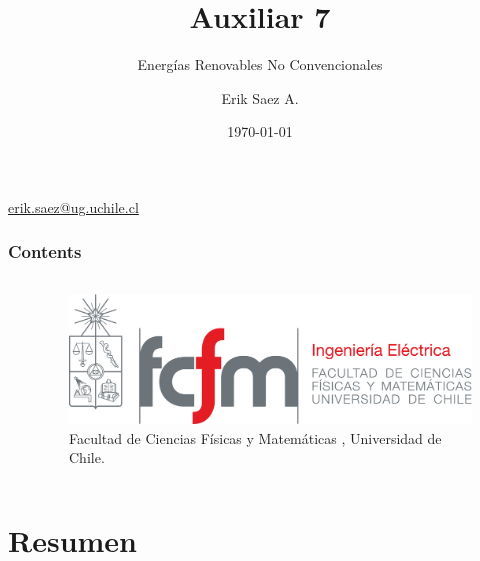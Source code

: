 \documentclass[
    10pt,
    aspectratio=169,
    xcolor={dvipsnames},
    spanish,
    ]{beamer}
\title[Presentation practice II]{\bfseries Auxiliar 7}
\subtitle{Energías Renovables No Convencionales}
\author[Erik Saez A.]{Erik Saez A.}
\institute[UChile]{Department of Electrical Engineering \\ Universidad de Chile}
\date{\today}
\begin{document}
\begin{frame}
  \titlepage
  \centering
   \href{mailto:erik.saez@ug.uchile.cl}{erik.saez@ug.uchile.cl} \hspace{.2cm}
\end{frame}

\begin{frame}
  \frametitle{Contents}
  \centering
  \begin{columns}
    \begin{column}{0.4\textwidth}
      \tableofcontents
    \end{column}
    \begin{column}{0.5\textwidth}
      \begin{figure}
        \centering
        \includegraphics[width=\textwidth]{fcfm_die}
        \caption{Facultad de Ciencias Físicas y Matemáticas , Universidad de Chile.}
      \end{figure}
    \end{column}
  \end{columns}  
\end{frame}
\section{Resumen}
\end{document}

